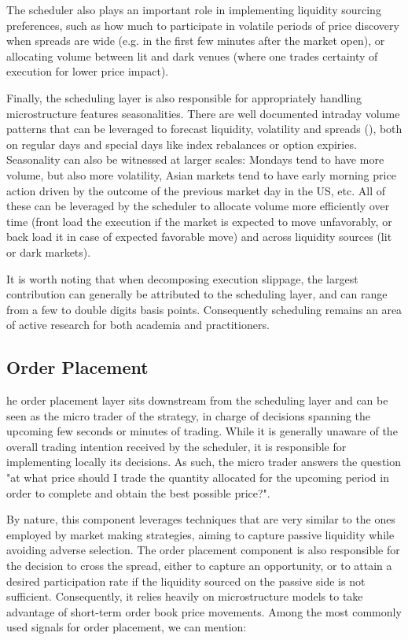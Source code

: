 The scheduler also plays an important role in  implementing liquidity sourcing preferences, such as how much to participate in volatile periods of price discovery when spreads are wide (e.g. in the first few minutes after the market open), or allocating volume between lit and dark venues (where one trades certainty of execution for lower price impact).

Finally, the scheduling layer is also responsible for appropriately handling microstructure features seasonalities. There are well documented intraday volume patterns that can be leveraged to forecast liquidity, volatility and spreads (), both on regular days and special days like index rebalances or option expiries. Seasonality can also be witnessed at larger scales: Mondays tend to have more volume, but also more volatility, Asian markets tend to have early morning price action driven by the outcome of the previous market day in the US, etc. All of these can be leveraged by the scheduler to allocate volume more efficiently over time (front load the execution if the market is expected to move unfavorably, or back load it in case of expected favorable move) and across liquidity sources (lit or dark markets). 

It is worth noting that when decomposing execution slippage, the largest contribution can generally be attributed to the scheduling layer, and can range from a few to double digits basis points. Consequently scheduling remains an area of active research for both academia and practitioners.

\subsection{Order Placement}

he order placement layer sits downstream from the scheduling layer and can be seen as the micro trader of the strategy, in charge of decisions spanning the upcoming few seconds or minutes of trading. While it is generally unaware of the overall trading intention received by the scheduler, it is responsible for implementing locally its decisions. As such, the micro trader answers the question "at what price should I trade the quantity allocated for the upcoming period in order to complete and obtain the best possible price?". 

By nature, this component leverages techniques that are very similar to the ones employed by market making strategies, aiming to capture passive liquidity while avoiding adverse selection. The order placement component is also responsible for the decision to cross the spread, either to capture an opportunity, or to attain a desired participation rate if the liquidity sourced on the passive side is not sufficient. Consequently, it relies heavily on microstructure models to take advantage of short-term order book price movements. Among the most commonly used signals for order placement, we can mention:

